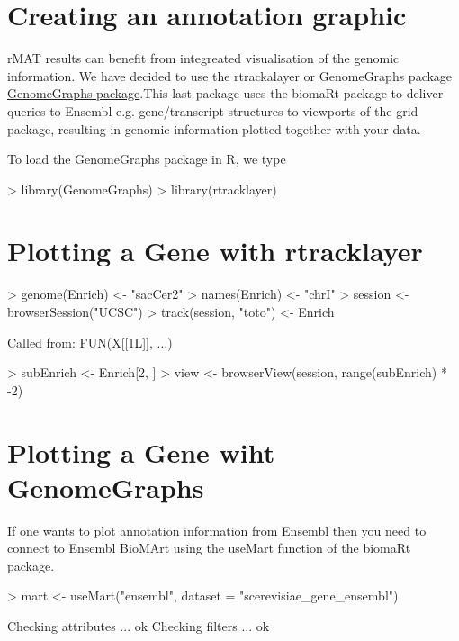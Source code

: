\documentclass[11pt]{article}
\begin{document}
\section{Creating an annotation graphic}
rMAT results can benefit from integreated visualisation of the genomic information. We have decided to use the rtrackalayer  or GenomeGraphs package \href{http://www.bioconductor.org/packages/2.2/bioc/html/GenomeGraphs.html}{GenomeGraphs package}.This last package uses the biomaRt package to deliver queries to Ensembl e.g. gene/transcript structures to viewports of the grid package, resulting in genomic information plotted together with your data. 

To load the GenomeGraphs package in R, we type 
\begin{Schunk}
\begin{Sinput}
> library(GenomeGraphs)
> library(rtracklayer)
\end{Sinput}
\end{Schunk}

\section{Plotting a Gene with rtracklayer}


\begin{Schunk}
\begin{Sinput}
> genome(Enrich) <- "sacCer2"
> names(Enrich) <- "chrI"
> session <- browserSession("UCSC")
> track(session, "toto") <- Enrich
\end{Sinput}
\begin{Soutput}
Called from: FUN(X[[1L]], ...)
\end{Soutput}
\begin{Sinput}
> subEnrich <- Enrich[2, ]
> view <- browserView(session, range(subEnrich) * -2)
\end{Sinput}
\end{Schunk}


\section{Plotting a Gene wiht GenomeGraphs}
If one wants to plot annotation information from Ensembl then you need to connect to Ensembl BioMArt using the useMart function of the biomaRt package.

\begin{Schunk}
\begin{Sinput}
> mart <- useMart("ensembl", dataset = "scerevisiae_gene_ensembl")
\end{Sinput}
\begin{Soutput}
Checking attributes ... ok
Checking filters ... ok
\end{Soutput}
\end{Schunk}
\end{document}
